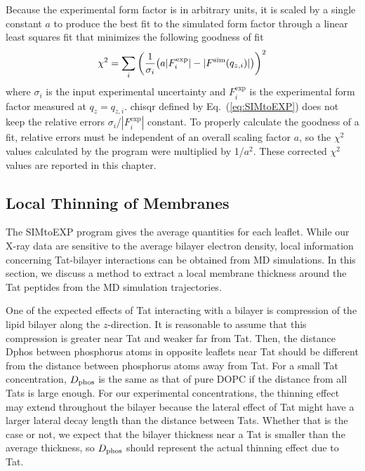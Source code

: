 Because the experimental form factor is in arbitrary units, it is 
scaled by a single constant $a$ to produce the best fit to the simulated
form factor through a linear least squares fit that minimizes the 
following goodness of fit
\begin{equation}
  \chi^2 = \sum_i \left(\frac{1}{\sigma_i}\mathopen{}\left( 
    a|F^\textrm{exp}_i| - |F^\textrm{sim}(q_{z,i})|
   \right)\mathclose{}\right)^2
  \label{eq:SIMtoEXP}
\end{equation}
where $\sigma_i$ is the input experimental uncertainty and $F_i^\textrm{exp}$
is the experimental form factor measured at $q_z = q_{z,i}$.
\gls{chisqr} defined by Eq.~(\ref{eq:SIMtoEXP}) does not keep the relative errors
$\sigma_i$/$|F_i^\textrm{exp}|$ constant. 
To properly calculate the goodness of a fit, relative errors must be 
independent of an overall scaling factor $a$, so
the $\chi^2$ values calculated by the program were multiplied by 1/$a^2$. 
These corrected $\chi^2$ values are reported in this chapter.

\subsection{Local Thinning of Membranes}\label{sec:local_thinning}
The SIMtoEXP program gives the average quantities for each leaflet. 
While our X-ray data are sensitive to the average bilayer electron density,
local information concerning Tat-bilayer interactions can be obtained from MD simulations.
In this section, we discuss a method to extract a local membrane thickness
around the Tat peptides from the MD simulation trajectories. 

One of the expected effects of Tat interacting with a bilayer is 
compression of the lipid bilayer along the $z$-direction. It is 
reasonable to assume that this compression is greater near Tat and
weaker far from Tat.
Then, the distance \gls{Dphos} between phosphorus atoms in opposite
leaflets near Tat should be different from the distance between
phosphorus atoms away from Tat.  
For a small Tat concentration, $D_\text{phos}$ is the same as that of 
pure DOPC if the distance from all Tats is large enough.  
For our experimental concentrations, the thinning effect may extend throughout 
the bilayer because the lateral effect of Tat might have a larger lateral decay 
length than the distance between Tats. Whether that is the case or not, we 
expect that the bilayer thickness near a Tat is smaller than the average thickness,
so $D_\text{phos}$ should represent the actual thinning effect due to Tat. 

